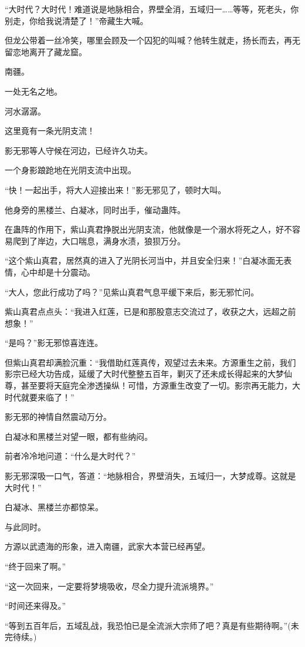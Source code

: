 \begin{this_body}
“大时代？大时代！难道说是地脉相合，界壁全消，五域归一……等等，死老头，你别走，你给我说清楚了！”帝藏生大喊。

但龙公带着一丝冷笑，哪里会顾及一个囚犯的叫喊？他转生就走，扬长而去，再无留恋地离开了藏龙窟。

南疆。

一处无名之地。

河水潺潺。

这里竟有一条光阴支流！

影无邪等人守候在河边，已经许久功夫。

一个身影踉跄地在光阴支流中出现。

“快！一起出手，将大人迎接出来！”影无邪见了，顿时大叫。

他身旁的黑楼兰、白凝冰，同时出手，催动蛊阵。

在蛊阵的作用下，紫山真君挣脱出光阴支流，他就像是一个溺水将死之人，好不容易爬到了岸边，大口喘息，满身水渍，狼狈万分。

“这个紫山真君，居然真的进入了光阴长河当中，并且安全归来！”白凝冰面无表情，心中却是十分震动。

“大人，您此行成功了吗？”见紫山真君气息平缓下来后，影无邪忙问。

紫山真君点点头：“我进入红莲，已是和那股意志交流过了，收获之大，远超之前想象！”

“是吗？”影无邪惊喜连连。

但紫山真君却满脸沉重：“我借助红莲真传，观望过去未来。方源重生之前，我们影宗已经大功告成，延缓了大时代整整五百年，剿灭了还未成长得起来的大梦仙尊，甚至要将天庭完全渗透操纵！可惜，方源重生改变了一切。影宗再无能力，大时代就要来临了！”

影无邪的神情自然震动万分。

白凝冰和黑楼兰对望一眼，都有些纳闷。

前者冷冷地问道：“什么是大时代？”

影无邪深吸一口气，答道：“地脉相合，界壁消失，五域归一，大梦成尊。这就是大时代！”

白凝冰、黑楼兰亦都惊呆。

与此同时。

方源以武遗海的形象，进入南疆，武家大本营已经再望。

“终于回来了啊。”

“这一次回来，一定要将梦境吸收，尽全力提升流派境界。”

“时间还来得及。”

“等到五百年后，五域乱战，我恐怕已是全流派大宗师了吧？真是有些期待啊。”(未完待续。)

\end{this_body}

